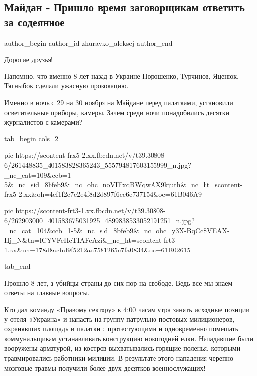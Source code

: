  
 
 
 
 
 
\subsection{Майдан - Пришло время заговорщикам ответить за содеянное}
\label{sec:29_11_2021.fb.zhuravko_aleksej.2.maidan}
 
\ifcmt
 author_begin
   author_id zhuravko_aleksej
 author_end
\fi

Дорогие друзья! 

Напомню, что именно 8 лет назад в Украине Порошенко, Турчинов, Яценюк, Тягныбок
сделали ужасную провокацию. 

Именно в ночь с 29 на 30 ноября на Майдане перед палатками, установили
осветительные приборы, камеры. Зачем среди ночи понадобились десятки
журналистов с камерами?

\ifcmt
  tab_begin cols=2

     pic https://scontent-frx5-2.xx.fbcdn.net/v/t39.30808-6/261448835_401583828365243_555794817603155999_n.jpg?_nc_cat=109&ccb=1-5&_nc_sid=8bfeb9&_nc_ohc=noVIFxqBWqwAX9kjuth&_nc_ht=scontent-frx5-2.xx&oh=4ef1f2e7e2e4f8d2d897f6ec6e737154&oe=61B046A9

     pic https://scontent-frt3-1.xx.fbcdn.net/v/t39.30808-6/262903000_401583675031925_4899838533052191251_n.jpg?_nc_cat=104&ccb=1-5&_nc_sid=8bfeb9&_nc_ohc=y3X-BqCcSVEAX-IIj_N&tn=lCYVFeHcTIAFcAzi&_nc_ht=scontent-frt3-1.xx&oh=178d8acbd9f5212ae7581265c7fa0834&oe=61B02615

  tab_end
\fi

Прошло 8 лет, а убийцы страны до сих пор на свободе. Ведь все мы знаем ответы
на главные вопросы.

Кто дал команду «Правому сектору» к 4:00 часам утра занять исходные позиции у
отеля «Украина» и напасть на группу патрульно-постовых милиционеров, охранявших
площадь и палатки с протестующими и одновременно помешать коммунальщикам
устанавливать конструкцию новогодней елки. Нападавшие были вооружены арматурой,
из костров выхватывались горящие поленья, которыми травмировались работники
милиции. В результате этого нападения черепно-мозговые травмы получили более
двух десятков военнослужащих!

